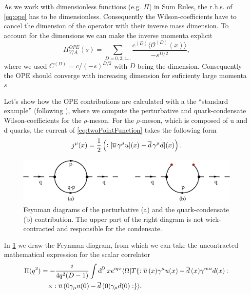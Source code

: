 \documentclass[../../index.tex]{subfiles}
\begin{document}
As we work with dimensionless functions (e.g. $\Pi$) in Sum Rules, the r.h.s.
of \cref{eq:ope} has to be dimensionless. Consequently the
Wilson-coefficients have to cancel the dimension of the operator with their
inverse mass dimension. To account for the dimensions we can make the inverse
momenta explicit
\begin{equation}
  \Pi_{V/A}^{OPE}(s) = \sum_{D=0,2,4\dots} \frac{c^{(D)} \langle \mathcal{O}^{(D)}(x) \rangle}{-s^{D/2}},
\end{equation}
where we used $C^{(D)}=c/(-s)^{D/2}$ with $D$ being the dimension. Consequently
the OPE should converge with increasing dimension for suficienty large momenta $s$.

Let's show how the OPE contributions are calculated with a the
``standard example'' (following \cite{Pascual1986}), where we compute the
perturbative and quark-condensate Wilson-coefficients for the $\rho$-meson. 
For the $\rho$-meson, which is composed of u and d quarks, the current of \cref{eq:twoPointFunction} takes the
following form
\begin{equation}
  j^\mu(x) = \frac{1}{2}\left(:[\overline{u}\, \gamma^\mu u](x) - \overline{d}\, \gamma^\mu d](x)\right).
\end{equation}
\begin{figure}
  \centering
  \includegraphics[width=\textwidth]{./images/condensateFeynmanDiagram.eps}
  \caption{Feynman diagrams of the perturbative (a) and the quark-condensate (b)
  contribution. The upper part of the right diagram is not wick-contracted and responsible for the condensate.}
  \label{fig:OPEFeynmanDiagram}
\end{figure}
In \cref{fig:OPEFeynmanDiagram} we draw the Feynman-diagram,
from which we can take the uncontracted mathematical expression for the scalar correlator
\begin{equation}
  \begin{split}
    \Pi(q^2) &= - \frac{i}{4 q^2 (D -1)} \int \dif^D x e^{iqx} \langle \Omega | T \{:\anti{u}(x) \gamma^\mu u(x) - \anti{d}(x) \gamma^{mu} d(x): \\
    &\quad\times :\anti{u}(0 \gamma_\mu u(0) - \anti{d}(0)\gamma_\mu d(0): \} \rangle.
  \end{split}
\end{equation}
\end{document}
